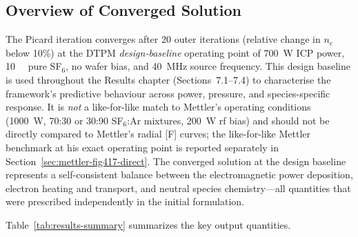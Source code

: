 \documentclass[11pt,a4paper]{report}
\begin{document}
\subsection{Overview of Converged Solution}

The Picard iteration converges after 20 outer iterations (relative change in $n_e$ below 10\%) at the DTPM \emph{design-baseline} operating point of \SI{700}{\watt} ICP power, \SI{10}{\milli\torr} pure SF$_6$, no wafer bias, and \SI{40}{\mega\hertz} source frequency.  This design baseline is used throughout the Results chapter (Sections~7.1--7.4) to characterise the framework's predictive behaviour across power, pressure, and species-specific response.  It is \emph{not} a like-for-like match to Mettler's operating conditions (1000~W, 70:30 or 30:90 SF$_6$:Ar mixtures, 200~W rf bias) and should not be directly compared to Mettler's radial [F] curves; the like-for-like Mettler benchmark at his exact operating point is reported separately in Section~\ref{sec:mettler-fig417-direct}.  The converged solution at the design baseline represents a self-consistent balance between the electromagnetic power deposition, electron heating and transport, and neutral species chemistry---all quantities that were prescribed independently in the initial formulation.

Table~\ref{tab:results-summary} summarizes the key output quantities.
\end{document}
